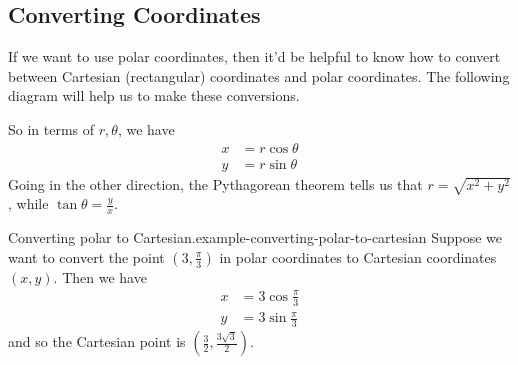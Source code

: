 \documentclass[10pt,]{book}
\numberwithin{equation}{section}
\newcommand{\amp}{&}
\begin{document}
\subsection[{Converting Coordinates}]{Converting Coordinates}\label{subsection-converting-coordinates}
\hypertarget{p-1019}{}%
If we want to use polar coordinates, then it'd be helpful to know how to convert between Cartesian (rectangular) coordinates and polar coordinates. The following diagram will help us to make these conversions.%
\begin{figure}
\centering
{
}
\end{figure}
\hypertarget{p-1020}{}%
So in terms of \(r,\theta\), we have%
%
\begin{align*}
x \amp = r\cos\theta \\
y \amp = r\sin\theta 
\end{align*}
\hypertarget{p-1021}{}%
Going in the other direction, the Pythagorean theorem tells us that \(r = \sqrt{x^{2}+y^{2}}\), while \(\tan\theta = \frac{y}{x}\).%
\begin{example}{Converting polar to Cartesian.}{example-converting-polar-to-cartesian}%
\hypertarget{p-1022}{}%
Suppose we want to convert the point \((3,\frac{\pi}{3})\) in polar coordinates to Cartesian coordinates \((x,y)\). Then we have%
%
\begin{align*}
x \amp = 3\cos\frac{\pi}{3} \\
y \amp = 3\sin\frac{\pi}{3} 
\end{align*}
\hypertarget{p-1023}{}%
and so the Cartesian point is \((\frac{3}{2},\frac{3\sqrt{3}}{2}).\)%
\end{example}
\end{document}
